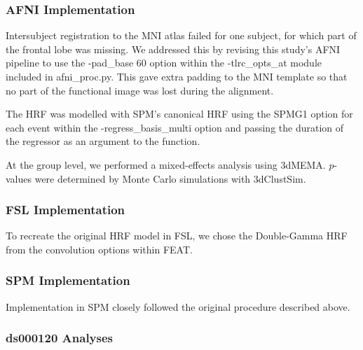 \subsubsection{AFNI Implementation}
Intersubject registration to the MNI atlas failed for one subject, for which part of the frontal lobe was missing. We addressed this by revising this study's AFNI pipeline to use the -pad\_base 60 option within the -tlrc\_opts\_at module included in afni\_proc.py. This gave extra padding to the MNI template so that no part of the functional image was lost during the alignment. 

The HRF was modelled with SPM's canonical HRF using the SPMG1 option for each event within the -regress\_basis\_multi option and passing the duration of the regressor as an argument to the function.

At the group level, we performed a mixed-effects analysis using 3dMEMA. $p$-values were determined by Monte Carlo simulations with 3dClustSim.

\subsubsection{FSL Implementation}
To recreate the original HRF model in FSL, we chose the Double-Gamma HRF from the convolution options within FEAT. 

\subsubsection{SPM Implementation}
Implementation in SPM closely followed the original procedure described above.


\subsubsection{ds000120 Analyses}

